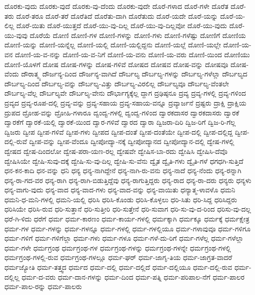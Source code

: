 {ದೊರಕು-ವುದು
ದೊರಕು-ವುದೆ
ದೊರಕು-ವು-ದೆಂದು
ದೊರಕು-ವುದೇ
ದೊರೆ-ಗಳಾದ
ದೊರೆ-ಗಳೇ
ದೊರೆತ
ದೊರೆ-ತರು
ದೊರೆ-ತರೂ
ದೊರೆ-ತರೆ
ದೊರೆತಿದೆ
ದೊರೆತು-ದಾಗಿ
ದೊರೆತುದು
ದೊರೆ-ಯದೇ
ದೊರೆ-ಯನ್ನು
ದೊರೆ-ಯ-ಲಿಲ್ಲ
ದೊರೆ-ಯಿತು
ದೊರೆ-ಯುತ್ತದೆ
ದೊರೆ-ಯು-ವು-ದಿಲ್ಲ
ದೊರೆ-ಯು-ವು-ದಿಲ್ಲವೋ
ದೊರೆ-ಯು-ವುದು
ದೊರೆ-ಯು-ವುವು
ದೊರೆಯೆ
ದೋಣಿ
ದೋಣಿ-ಗಳ
ದೋಣಿ-ಗಳನ್ನು
ದೋಣಿ-ಗಳು
ದೋಣಿ-ಗಳೆಷ್ಟು
ದೋಣಿಗೆ
ದೋಣಿಯ
ದೋಣಿ-ಯನ್ನು
ದೋಣಿ-ಯನ್ನೆಲ್ಲ
ದೋಣಿ-ಯಲ್ಲಿ
ದೋಣಿ-ಯಲ್ಲಿದ್ದನು
ದೋಣಿ-ಯಲ್ಲೆ
ದೋಣಿ-ಯಲ್ಲೇ
ದೋಣಿ-ಯ-ವನ
ದೋಣಿ-ಯ-ವ-ನನ್ನು
ದೋಣಿ-ಯ-ವ-ನಿಗೆ
ದೋಣಿ-ಯ-ವನು
ದೋಣಿ-ಯ-ವರು
ದೋಣಿ-ಯಿಂದ
ದೋಣಿಯು
ದೋಣಿ-ಯೊಳಗೆ
ದೋಷ
ದೋಷ-ಗಳನ್ನು
ದೋಷ-ಗಳಿವೆ
ದೋಷದ
ದೋಷವ
ದೋಷ-ವನ್ನು
ದೋಷವೂ
ದೋಷ-ವೆಂದು
ದೌರಾತ್ಮ್ಯ
ದೌರ್ಜನ್ಯ-ದಿಂದ
ದೌರ್ಜನ್ಯ-ವಾಗಿದೆ
ದೌರ್ಬಲ್ಯ
ದೌರ್ಬಲ್ಯ-ಗಳನ್ನು
ದೌರ್ಬಲ್ಯ-ಗಳೆಲ್ಲಾ
ದೌರ್ಬಲ್ಯದ
ದೌರ್ಬಲ್ಯ-ದಿಂದ
ದೌರ್ಬಲ್ಯ-ವನ್ನು
ದೌರ್ಬಲ್ಯ-ವಿತ್ತು
ದೌರ್ಬಲ್ಯ-ವಿರಲಿಲ್ಲ
ದೌರ್ಬಲ್ಯವೂ
ದೌರ್ಬಲ್ಯ-ವೆಂತಲೇ
ದೌರ್ಬಲ್ಯ-ವೆಲ್ಲ
ದೌರ್ಬಲ್ಯವೇ
ದೌರ್ಬಲ್ಯ-ವೇನು
ದೌರ್ಭಾಗ್ಯಕ್ಕೆಲ್ಲ
ದ್ದಾಗ
ದ್ರಢಿಷ್ಠನೂ
ದ್ರವ್ಯ
ದ್ರವ್ಯ-ಗಳಲ್ಲಿ
ದ್ರವ್ಯ-ಗಳಿಂದ
ದ್ರವ್ಯದ
ದ್ರವ್ಯ-ರೂಪ-ದಲ್ಲಿ
ದ್ರವ್ಯ-ವನ್ನು
ದ್ರವ್ಯ-ಸಹಾಯ
ದ್ರವ್ಯ-ಸಹಾಯ-ವನ್ನೂ
ದ್ರವ್ಯಾರ್ಜನೆ
ದ್ರಷ್ಟರು
ದ್ರಾಕ್ಷಿ
ದ್ರಾಕ್ಷಿಯ
ದ್ರುಪದ
ದ್ರೋಹ-ವನ್ನು
ದ್ರೋಹಿ-ಗಳಾರೂ
ದ್ವಂದ್ವ-ಗಳಲ್ಲಿ
ದ್ವಂದ್ವ-ಗಳಿಂದ
ದ್ವಾರಕದಾಸರ
ದ್ವಾರಕದಾಸರು
ದ್ವಾರಕೆ
ದ್ವಾರಕೆಗೆ
ದ್ವಾರಕೆ-ಯಲ್ಲಿ
ದ್ವಾರಕೆ-ಯಿಂದ
ದ್ವಾರ-ಗಳಿವೆ
ದ್ವಾರದ
ದ್ವಾರಾ
ದ್ವಿಜರಾ-ದಿರಿ
ದ್ವಿಜ-ರಿಗೆ
ದ್ವಿಜ-ರಿ-ಗೆಲ್ಲ
ದ್ವಿಜರು
ದ್ವೀಪ
ದ್ವೀಪ-ಗಳಿವೆ
ದ್ವೀಪ-ಗಳು
ದ್ವೀಪದ
ದ್ವೀಪ-ದಂತೆ
ದ್ವೀಪ-ದಂತೆಯೇ
ದ್ವೀಪ-ದಲ್ಲಿ
ದ್ವೀಪ-ದಲ್ಲಿದ್ದ
ದ್ವೀಪ-ದಲ್ಲಿ-ರುವೆ
ದ್ವೀಪ-ವನ್ನು
ದ್ವೀಪ-ವೆಂದೂ
ದ್ವೀಪೋದ್ಯಾ-ನಕ್ಕೆ
ದ್ವೀಪೋದ್ಯಾನದ
ದ್ವೀಪೋದ್ಯಾನ-ದಲ್ಲಿ
ದ್ವೇಷ-ಗಳಲ್ಲಿ
ದ್ವೇಷದ
ದ್ವೇಷ-ದಿಂದಲೋ
ದ್ವೇಷ-ಪರಾ-ಯಣ-ರಲ್ಲ
ದ್ವೇಷವೇ
ದ್ವೇಷಿಸ-ಬಾ-ರದು
ದ್ವೇಷಿಸಿ
ದ್ವೇಷಿಸಿ-ದೆವೊ
ದ್ವೇಷಿಸಿಯೇ
ದ್ವೇಷಿ-ಸುವು-ದಕ್ಕೆ
ದ್ವೇಷಿ-ಸು-ವು-ದಿಲ್ಲ
ದ್ವೇಷಿ-ಸು-ವೆನು
ದ್ವೈತ
ದ್ವೈತಿ-ಗಳು
ದ್ವೈತಿ-ಗಳೆ
ಧಗಧಗಿ-ಸುತ್ತಿದೆ
ಧನ-ಕನ-ಕಾದಿ
ಧನ-ವನ್ನು
ಧನಿ
ಧನ್ಯ
ಧನ್ಯ-ನಾಗಿದ್ದೇನೆ
ಧನ್ಯ-ನಾಗಿ-ರು-ವನು
ಧನ್ಯ-ನಾದೆ
ಧನ್ಯ-ನೆಂದು
ಧನ್ಯ-ರನ್ನಾಗಿ
ಧನ್ಯ-ರಾ-ಗದ-ವರ
ಧನ್ಯ-ರಾಗಿ
ಧನ್ಯ-ರಾಗಿ-ಬಿಡುತ್ತಿದ್ದೆವು
ಧನ್ಯ-ರಾಗುತ್ತಿದ್ದರು
ಧನ್ಯ-ರಾದ
ಧನ್ಯ-ರಾ-ದರು
ಧನ್ಯರು
ಧನ್ಯಳು
ಧನ್ಯ-ವಾಗು-ವುದು
ಧನ್ಯ-ವಾದ
ಧನ್ಯ-ವಾದ-ಗಳು
ಧನ್ಯ-ವಾದ-ವನ್ನು
ಧನ್ಯ-ವಾಯಿತು
ಧನ್ಯಾತ್ಮ-ಳಾವಳೊ
ಧಮನಿ
ಧಮನಿ-ಧ-ಮನಿ-ಗಳಲ್ಲಿ
ಧಮನಿ-ಯಲ್ಲಿ
ಧರಿಸಿ
ಧರಿಸಿ-ಕೊಂಡು
ಧರಿಸಿ-ಕೊಳ್ಳಲು
ಧರಿ-ಸಿತು
ಧರಿ-ಸಿದ್ದ
ಧರಿಸಿದ್ದರು
ಧರಿಸಿಯೇ
ಧರಿಸಿ-ರುವ
ಧರಿ-ಸುತ್ತಾನೆ
ಧರಿ-ಸುತ್ತೀರಿ
ಧರಿ-ಸುತ್ತೇನೆ
ಧರಿ-ಸುವಾಗ
ಧರಿ-ಸು-ವು-ದ-ರಿಂದ
ಧರಿಸು-ವು-ದಲ್ಲ
ಧರೆ-ಗಿ-ಳಿದು
ಧರೆಗೆ
ಧರ್ಮ
ಧರ್ಮ-ಕಾರಣಂ
ಧರ್ಮ-ಕಾರ್ಯ-ಗಳಲ್ಲಿ
ಧರ್ಮಕ್ಕಾಗಿ
ಧರ್ಮಕ್ಕೂ
ಧರ್ಮಕ್ಕೆ
ಧರ್ಮಕ್ಷೇತ್ರ
ಧರ್ಮ-ಗಳ
ಧರ್ಮ-ಗಳನ್ನು
ಧರ್ಮ-ಗಳನ್ನೂ
ಧರ್ಮ-ಗಳಲ್ಲಿ
ಧರ್ಮ-ಗಳಲ್ಲಿಯೂ
ಧರ್ಮ-ಗಳಾವುವೂ
ಧರ್ಮ-ಗಳಿಗೂ
ಧರ್ಮ-ಗಳಿಗೆ
ಧರ್ಮ-ಗಳಿಗೆಲ್ಲಾ
ಧರ್ಮ-ಗಳು
ಧರ್ಮ-ಗಳೂ
ಧರ್ಮ-ಗಳೆ-ದು-ರಿಗೆ
ಧರ್ಮ-ಗಳೆಲ್ಲ
ಧರ್ಮ-ಗಳೆಲ್ಲಾ
ಧರ್ಮ-ಗಳೇ
ಧರ್ಮಗ್ರಂಥ
ಧರ್ಮಗ್ರಂಥ-ಗಳ
ಧರ್ಮಗ್ರಂಥ-ಗಳನ್ನು
ಧರ್ಮಗ್ರಂಥ-ಗಳನ್ನೇ
ಧರ್ಮಗ್ರಂಥ-ಗಳಲ್ಲಿ
ಧರ್ಮಗ್ರಂಥ-ಗಳಲ್ಲಿ-ರುವ
ಧರ್ಮಗ್ರಂಥ-ಗಳಲ್ಲೂ
ಧರ್ಮ-ಘರ್
ಧರ್ಮ-ಜಾಗೃ-ತಿಯ
ಧರ್ಮ-ಜಾಗ್ರತ-ವಾದರೆ
ಧರ್ಮಜ್ಯೋತಿ
ಧರ್ಮ-ತತ್ತ್ವದ
ಧರ್ಮದ
ಧರ್ಮ-ದಲ್ಲಿ
ಧರ್ಮ-ದಲ್ಲಿದೆ
ಧರ್ಮ-ದಲ್ಲಿಯೂ
ಧರ್ಮ-ದಲ್ಲಿ-ರುವ
ಧರ್ಮ-ದಲ್ಲಿಲ್ಲ
ಧರ್ಮ-ದ-ವರು
ಧರ್ಮ-ದಾನ-ಗಳನ್ನು
ಧರ್ಮ-ದಿಂದ
ಧರ್ಮ-ಪತ್ನಿ
ಧರ್ಮ-ಪರಿಪಾಲ-ನೆಗೆ
ಧರ್ಮ-ಪಾಲರ
ಧರ್ಮ-ಪಾಲ-ರನ್ನು
ಧರ್ಮ-ಪಾಲರು
}
